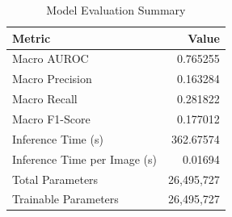 \begin{table}[ht]
  \centering
  \caption{Model Evaluation Summary}
  \label{tab:summary}
  \begin{tabular}{lr}
    \toprule
    \textbf{Metric} & \textbf{Value} \\
    \midrule
  Macro AUROC & 0.765255 \\
  Macro Precision & 0.163284 \\
  Macro Recall & 0.281822 \\
  Macro F1-Score & 0.177012 \\
  Inference Time (s) & 362.67574 \\
  Inference Time per Image (s) & 0.01694 \\
  Total Parameters & 26,495,727 \\
  Trainable Parameters & 26,495,727 \\
    \bottomrule
  \end{tabular}
\end{table}